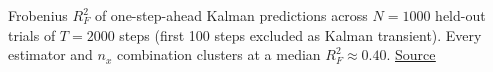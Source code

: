 Frobenius $R^2_F$ of one-step-ahead Kalman predictions across $N = 1000$ held-out trials of $T = 2000$ steps (first 100 steps excluded as Kalman transient). Every estimator and $n_x$ combination clusters at a median $R^2_F \approx 0.40$. \href{https://github.com/tahmidazam/gg4/blob/main/notebooks/obs_reconstruction/obs_reconstruction.ipynb}{\underline{Source}}%